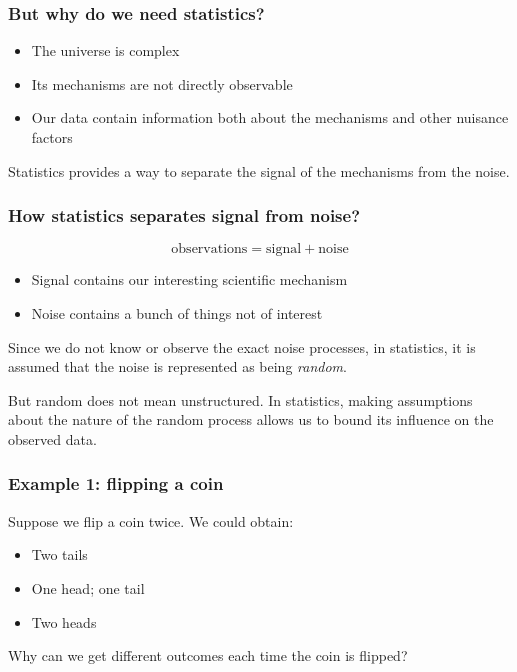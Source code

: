 \documentclass[handout]{beamer}
\begin{document}
\begin{frame}
	\frametitle{But why do we need statistics?}
	
	\begin{itemize}
		\item The universe is complex
		\item Its mechanisms are not directly observable
		\item Our data contain information both about the mechanisms and other nuisance factors
	\end{itemize}
	
	Statistics provides a way to separate the signal of the mechanisms from the noise.
	
\end{frame}

\begin{frame}
	\frametitle{How statistics separates signal from noise?}
	
	\begin{equation}
	\text{observations} = \text{signal} + \text{noise}
	\end{equation}
	
	\begin{itemize}
		\item Signal contains our interesting scientific mechanism
		\item Noise contains a bunch of things not of interest
	\end{itemize}
	
	Since we do not know or observe the exact noise processes, in statistics, it is assumed that the noise is represented as being \textit{random}.
	
	\vspace{0.5cm}
	
	But random does not mean unstructured. In statistics, making assumptions about the nature of the random process allows us to bound its influence on the observed data.
	
\end{frame}

\begin{frame}
	\frametitle{Example 1: flipping a coin}
	
	Suppose we flip a coin twice. We could obtain:
	
	\begin{itemize}
		\item Two tails
		\item One head; one tail
		\item Two heads
	\end{itemize}
	
	Why can we get different outcomes each time the coin is flipped?
	
\end{frame}
\end{document}
